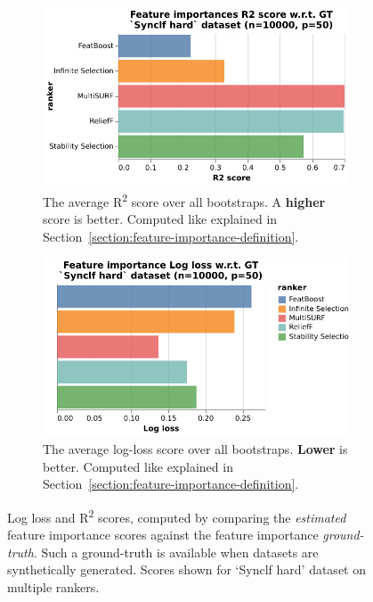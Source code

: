 \documentclass[../main.tex]{subfiles}
\begin{document}
\begin{figure}[ht]
     \centering
     \begin{subfigure}[b]{0.49\textwidth}
        \centering
        \includegraphics[width=\linewidth]{report/images/results-r2-score-various-rankers.pdf}
        \caption{The average R\textsuperscript{2} score over all bootstraps. A \textbf{higher} score is better. Computed like explained in Section~\ref{section:feature-importance-definition}.}
        \label{fig:results-r2-score-various-rankers}
     \end{subfigure}
     \hfill
     \begin{subfigure}[b]{0.49\textwidth}
        \centering
        \includegraphics[width=\linewidth]{report/images/results-log-loss-various-rankers.pdf}
        \caption{The average log-loss score over all bootstraps. \textbf{Lower} is better. Computed like explained in Section~\ref{section:feature-importance-definition}.}
        \label{fig:results-log-loss-various-rankers}
     \end{subfigure}
     
    \caption{Log loss and R\textsuperscript{2} scores, computed by comparing the \textit{estimated} feature importance scores against the feature importance \textit{ground-truth}. Such a ground-truth is available when datasets are synthetically generated. Scores shown for `Synclf hard' dataset on multiple rankers.}
    \label{fig:results-ground-truth-various-rankers}
\end{figure}
\end{document}
